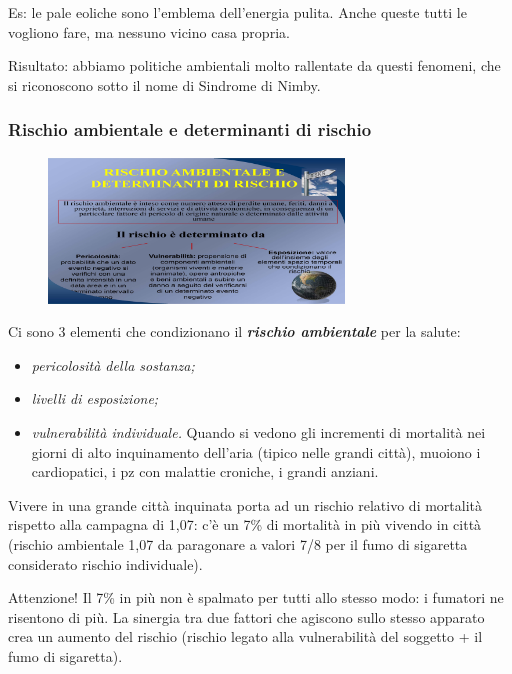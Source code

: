 Es: le pale eoliche sono l'emblema dell'energia pulita. Anche queste
tutti le vogliono fare, ma nessuno vicino casa propria.

Risultato: abbiamo politiche ambientali molto rallentate da questi
fenomeni, che si riconoscono sotto il nome di Sindrome di Nimby.

\subsubsection{Rischio ambientale e determinanti di rischio}

\begin{figure}[!ht]
\centering
	\includegraphics[width=0.7\textwidth]{22/image7.jpeg}
	\end{figure}
	
Ci sono 3 elementi che condizionano il \emph{\textbf{rischio
ambientale}} per la salute:

\begin{itemize}
\item
  \emph{pericolosità della sostanza;}
\item
  \emph{livelli di esposizione;}
\item
  \emph{vulnerabilità individuale.} Quando si vedono gli incrementi di
  mortalità nei giorni di alto inquinamento dell'aria (tipico nelle
  grandi città), muoiono i cardiopatici, i pz con malattie croniche, i
  grandi anziani.
\end{itemize}

Vivere in una grande città inquinata porta ad un rischio relativo di
mortalità rispetto alla campagna di 1,07: c'è un 7\% di mortalità in più
vivendo in città (rischio ambientale 1,07 da paragonare a valori 7/8 per
il fumo di sigaretta considerato rischio individuale).

Attenzione! Il 7\% in più non è spalmato per tutti allo stesso modo: i
fumatori ne risentono di più. La sinergia tra due fattori che agiscono
sullo stesso apparato crea un aumento del rischio (rischio legato alla
vulnerabilità del soggetto + il fumo di sigaretta).


